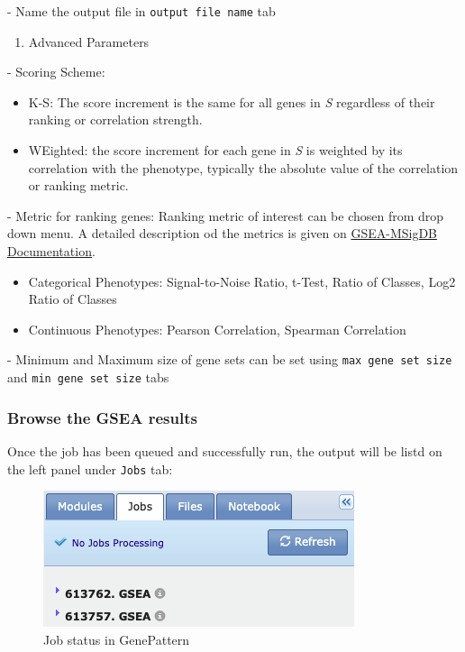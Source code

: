 \documentclass[
]{book}
\providecommand{\tightlist}{%
  \setlength{\itemsep}{0pt}\setlength{\parskip}{0pt}}
\begin{document}
- Name the output file in \texttt{output\ file\ name} tab

\begin{enumerate}
\def\labelenumi{\arabic{enumi}.}
\setcounter{enumi}{1}
\tightlist
\item
  Advanced Parameters
\end{enumerate}

- Scoring Scheme:

\begin{itemize}
\item
  K-S: The score increment is the same for all genes in \emph{S} regardless of their ranking or correlation strength.
\item
  WEighted: the score increment for each gene in \emph{S} is weighted by its correlation with the phenotype, typically the absolute value of the correlation or ranking metric.
\end{itemize}

- Metric for ranking genes: Ranking metric of interest can be chosen from drop down menu. A detailed description od the metrics is given on \href{https://docs.gsea-msigdb.org/\#GSEA/GSEA_User_Guide/\#metrics-for-ranking-genes}{GSEA-MSigDB Documentation}.

\begin{itemize}
\item
  Categorical Phenotypes: Signal-to-Noise Ratio, t-Test, Ratio of Classes, Log2 Ratio of Classes
\item
  Continuous Phenotypes: Pearson Correlation, Spearman Correlation
\end{itemize}

- Minimum and Maximum size of gene sets can be set using \texttt{max\ gene\ set\ size} and \texttt{min\ gene\ set\ size} tabs

\hypertarget{browse-the-gsea-results}{%
\subsubsection{Browse the GSEA results}\label{browse-the-gsea-results}}

Once the job has been queued and successfully run, the output will be listd on the left panel under \texttt{Jobs} tab:

\begin{figure}

{\centering \includegraphics{images/GenePattern-Jobs} 

}

\caption{Job status in GenePattern}\label{fig:unnamed-chunk-25}
\end{figure}
\end{document}
